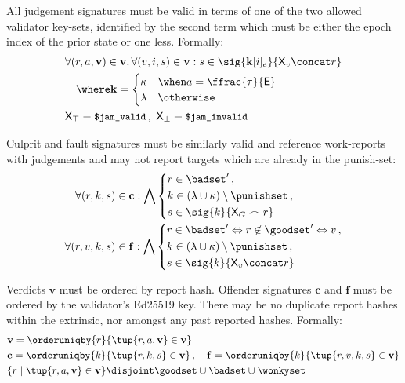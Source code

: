All judgement signatures must be valid in terms of one of the two allowed validator key-sets, identified by the second term which must be either the epoch index of the prior state or one less. Formally:
\begin{align}
  &\begin{aligned}
    &\forall (r, a, \mathbf{v}) \in \mathbf{v}, \forall (v, i, s) \in \mathbf{v} : s \in \sig{\mathbf{k}[i]_e}{\mathsf{X}_v \concat r}\\
    &\quad\where \mathbf{k} = \begin{cases}
      \kappa &\when a = \displaystyle \ffrac{\tau}{\mathsf{E}}\\
      \lambda &\otherwise\\
    \end{cases}
  \end{aligned}\\
  &\mathsf{X}_\top \equiv \text{{\small \texttt{\$jam\_valid}}}\,,\ \mathsf{X}_\bot \equiv \text{{\small \texttt{\$jam\_invalid}}}
\end{align}

Culprit and fault signatures must be similarly valid and reference work-reports with judgements and may not report targets which are already in the punish-set:
\begin{align}
  \forall (r, k, s) &\in \mathbf{c} : \bigwedge \left\{
  \begin{aligned}
    &r \in \badset' \,,\\
    &k \in (\lambda \cup \kappa) \setminus \punishset \,,\\
    &s \in \sig{k}{\mathsf{X}_G \frown r}
  \end{aligned}\right.\\
  \forall (r, v, k, s) &\in \mathbf{f} : \bigwedge \left\{ \begin{aligned}
    &r \in \badset' \Leftrightarrow r \not\in \goodset' \Leftrightarrow v \,,\\
    &k \in (\lambda \cup \kappa) \setminus \punishset \,,\\
    &s \in \sig{k}{\mathsf{X}_v \concat r}\\
  \end{aligned}\right.
\end{align}

Verdicts $\mathbf{v}$ must be ordered by report hash. Offender signatures $\mathbf{c}$ and $\mathbf{f}$ must be ordered by the validator's Ed25519 key. There may be no duplicate report hashes within the extrinsic, nor amongst any past reported hashes. Formally:
\begin{align}
  &\mathbf{v} = \orderuniqby{r}{\tup{r, a, \mathbf{v}} \in \mathbf{v}}\\
  &\mathbf{c} = \orderuniqby{k}{\tup{r, k, s} \in \mathbf{v}} \,,\quad
  \mathbf{f} = \orderuniqby{k}{\tup{r, v, k, s} \in \mathbf{v}}\\
  &\{r \mid \tup{r, a, \mathbf{v}} \in \mathbf{v}\} \disjoint \goodset \cup \badset \cup \wonkyset
\end{align}

